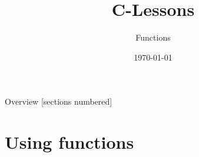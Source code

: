 


\title{C-Lessons}
\subtitle{Functions}
\date{\today}

\usetikzlibrary{tikzmark}


\begin{frame}
	\titlepage
\end{frame}
\begin{frame}{Overview}
	[sections numbered]
	\tableofcontents
\end{frame}

\section{Using functions}

